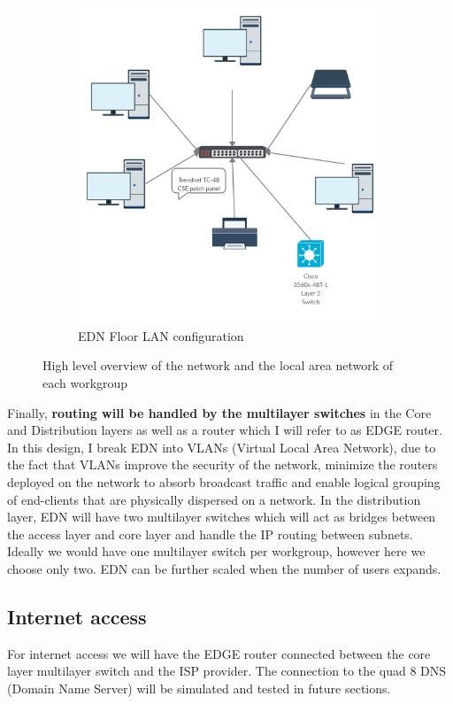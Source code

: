 \documentclass[ a4, 12pt, onecolumn]{IEEEtran}
\begin{document}
\begin{figure}[H]
\begin{subfigure}[b]{0.5\textwidth}
    \includegraphics[width=\textwidth]{star.png}
    \caption{EDN Floor LAN configuration}
\label{fig:str}
  \end{subfigure}
  \caption{High level overview of the network and the local area network of each workgroup }
\end{figure}
Finally, \textbf{routing will be handled by the multilayer switches} in the Core and Distribution layers as well as a router which I will refer to as EDGE router.
In this design, I break EDN into VLANs (Virtual Local Area Network), due to the fact that VLANs improve the security of the network, minimize the routers deployed on the network to absorb broadcast traffic and enable logical grouping of end-clients that are physically dispersed on a network. In the distribution layer, EDN will have two multilayer switches which will act as bridges between the access layer and core layer and handle the IP routing between subnets. Ideally we would have one multilayer switch per workgroup, however here we choose only two. EDN can be further scaled when the number of users expands.

\subsection{Internet access}
For internet access we will have the EDGE router connected between the core layer multilayer switch and the ISP provider. The connection to the quad 8 DNS (Domain Name Server) will be simulated and tested in future sections.
\end{document}
